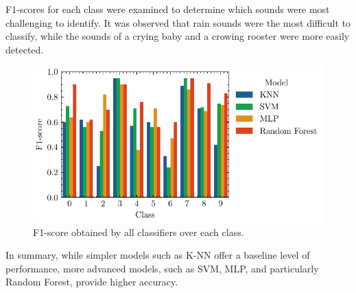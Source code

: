 \documentclass[journal]{IEEEtran}
\begin{document}
F1-scores for each class were examined to determine which sounds were most challenging to identify. It was observed that rain sounds were the most difficult to classify, while the sounds of a crying baby and a crowing rooster were more easily detected.

\begin{figure}[t]
    \centering
    \includegraphics[width=\linewidth]{class_f1.pdf}
    \caption{F1-score obtained by all classifiers over each class.}
    \label{fig:class_f1}
\end{figure}

In summary, while simpler models such as K-NN offer a baseline level of performance, more advanced models, such as SVM, MLP, and particularly Random Forest, provide higher accuracy.


%
\end{document}
